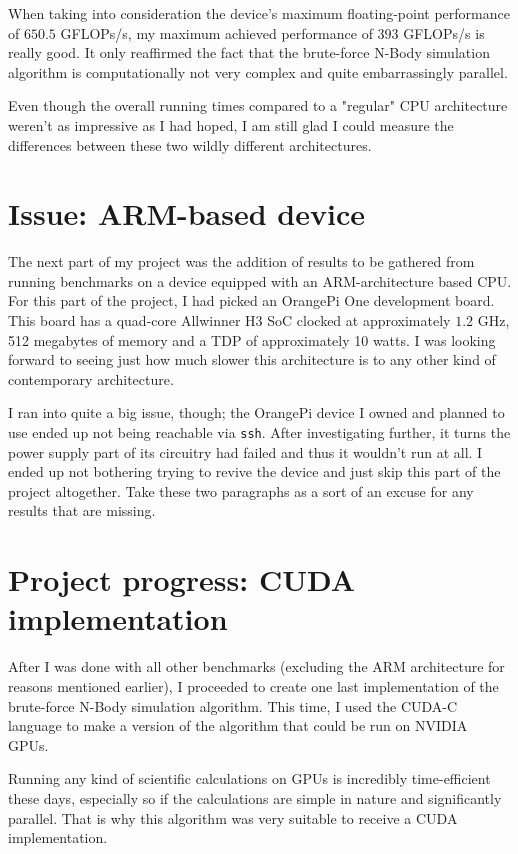 \documentclass[journal]{IEEEtran}
\begin{document}
			When taking into consideration the device's maximum floating-point performance of $650.5$ GFLOPs/s, my maximum achieved performance of $393$ GFLOPs/s is really good. It only reaffirmed the fact that the brute-force N-Body simulation algorithm is computationally not very complex and quite embarrassingly parallel.
			
			Even though the overall running times compared to a "regular" CPU architecture weren't as impressive as I had hoped, I am still glad I could measure the differences between these two wildly different architectures.
		
	\section{Issue: ARM-based device}
	\label{orangepi}
	
		The next part of my project was the addition of results to be gathered from running benchmarks on a device equipped with an ARM-architecture based CPU. For this part of the project, I had picked an OrangePi One development board. This board has a quad-core Allwinner H3 SoC clocked at approximately $1.2$ GHz, 512 megabytes of memory and a TDP of approximately 10 watts. I was looking forward to seeing just how much slower this architecture is to any other kind of contemporary architecture.
		
		I ran into quite a big issue, though; the OrangePi device I owned and planned to use ended up not being reachable via \texttt{ssh}. After investigating further, it turns the power supply part of its circuitry had failed and thus it wouldn't run at all. I ended up not bothering trying to revive the device and just skip this part of the project altogether. Take these two paragraphs as a sort of an excuse for any results that are missing.
	
	\section{Project progress: CUDA implementation}
	\label{cudasection}
	
		After I was done with all other benchmarks (excluding the ARM architecture for reasons mentioned earlier), I proceeded to create one last implementation of the brute-force N-Body simulation algorithm. This time, I used the CUDA-C language to make a version of the algorithm that could be run on NVIDIA GPUs.
		
		Running any kind of scientific calculations on GPUs is incredibly time-efficient these days, especially so if the calculations are simple in nature and significantly parallel. That is why this algorithm was very suitable to receive a CUDA implementation.
		
\end{document}
